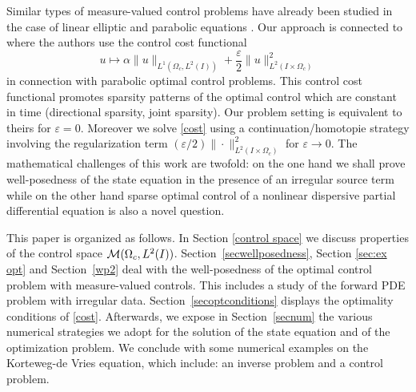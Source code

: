 Similar types of measure-valued control problems have already been studied in the case of linear elliptic and parabolic equations \cite{pieper2013priori,clason2011duality,casas2012approximation,casas2013parabolic,ClasonKunisch:2011b,CasasZuazua13,CasasVexlerZuazua13,CasasKunisch15}. Our approach is connected to \cite{herzog2012directional} where the authors use the control cost functional 
\[
u\mapsto\alpha \|u\|_{L^1(\Omega_c,L^2(I))}+\frac \varepsilon 2 \|u\|_{L^2(I\times \Omega_c)}^2
\]
in connection with parabolic optimal control problems. This control cost functional promotes sparsity patterns of the optimal control which are constant in time (directional sparsity, joint sparsity). Our problem setting is equivalent to theirs for $\varepsilon=0$. Moreover we solve \eqref{cost} using a continuation/homotopie strategy involving the regularization term $(\varepsilon/2)\|\cdot\|_{L^2(I\times \Omega_c)}^2$ for $\varepsilon\rightarrow 0$.
The mathematical challenges of this work are twofold: on the one hand we shall prove well-posedness of the state equation in the presence of an irregular source term while on the other hand sparse optimal control of a nonlinear dispersive partial differential equation is also a novel question. %

This paper is organized as follows. In Section \ref{control space} we discuss properties of the control space $\mathcal{M}(\Omega_c, L^{2}(I))$. Section~\ref{secwellposedness}, Section \ref{sec:ex opt} and Section~\ref{wp2} deal with the well-posedness of the optimal control problem with measure-valued controls. This includes a study of the forward PDE problem with irregular data. Section~\ref{secoptconditions} displays the optimality conditions of \eqref{cost}. Afterwards, we expose in Section~\ref{secnum} the various numerical strategies we adopt for the solution of the state equation and  of the optimization problem. We conclude with some numerical examples on the Korteweg-de Vries equation, which include: an inverse problem and a control problem.

